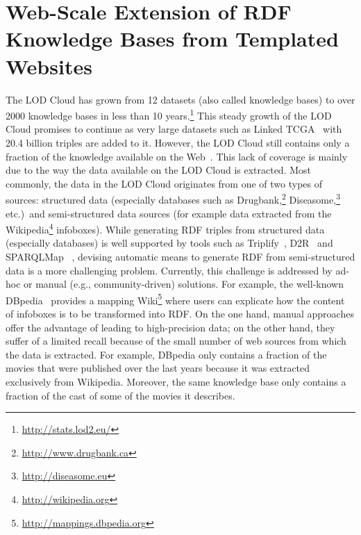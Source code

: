 \chapter{Web-Scale Extension of RDF Knowledge Bases from Templated Websites}


The \ac{LOD} Cloud has grown from 12 datasets (also called knowledge bases) to over 2000 knowledge bases in less than 10 years.\footnote{\url{http://stats.lod2.eu/}}
This steady growth of the LOD Cloud promises to continue as very large datasets such as  Linked TCGA~\cite{SAL+13a} with 20.4 billion triples are added to it. However, the LOD Cloud still contains only a fraction of the knowledge available on the Web~\cite{GER+13}. This lack of coverage is mainly due to the way the data available on the LOD Cloud is extracted. Most commonly, the data in the LOD Cloud originates from one of two types of sources: structured data (especially databases such as Drugbank,\footnote{\url{http://www.drugbank.ca}} Diseasome,\footnote{\url{http://diseasome.eu}} etc.)~and semi-structured data sources (for example data extracted from the Wikipedia\footnote{\url{http://wikipedia.org}} infoboxes). While generating RDF triples from structured data (especially databases) is well supported by tools such as Triplify~\cite{DBLP:dblp_conf/www/AuerDLHA09}, D2R~\cite{Bizer04} and SPARQLMap~\cite{DBLP:conf/aswc/UnbehauenSA12}
, devising automatic means to generate RDF from semi-structured data is a more challenging  problem. 
Currently, this challenge is addressed by ad-hoc or manual (e.g., community-driven) solutions. 
For example, the well-known DBpedia~\cite{DBLP:conf/semweb/AuerBKLCI07} provides a mapping Wiki\footnote{\url{http://mappings.dbpedia.org}} where users can explicate how the content of infoboxes is to be transformed into RDF. On the one hand, manual approaches offer the advantage of leading to high-precision data; on the other hand, they suffer of a limited recall because of the small number of web sources from which the data is extracted. For example, DBpedia only contains a fraction of the movies that were published over the last years because it was extracted exclusively from Wikipedia.
Moreover, the same knowledge base only contains a fraction of the cast of some of the movies it describes.

